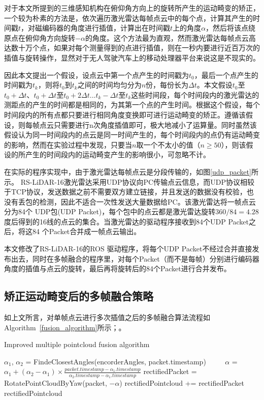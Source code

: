 对于本文所提到的三维感知机构在俯仰角方向上的旋转所产生的运动畸变的矫正，一个较为朴素的方法是，依次遍历激光雷达每帧点云中的每个点，计算其产生的时间戳$t$，对磁编码器的角度进行插值，计算出在时间戳$t$上的角度$\alpha$，然后将该点绕原点在俯仰角方向旋转$-\alpha$的角度。这个方法最为直观，然而激光雷达每帧点云高达数十万个点，如果对每个测量得到的点进行插值，则在一秒内要进行近百万次的插值与旋转操作，显然对于无人驾驶汽车上的移动处理器平台来说这是不现实的。

因此本文提出一个假设，设点云中第一个点产生的时间戳为$t_0$，最后一个点产生的时间戳为$t_k$，则将$t_0$到$t_k$之间的时间均匀分为$n$份，每份长为$\Delta t$。本文假设$t_0$至$t_0+\Delta t$、$t_0+\Delta t$至$t_0+2\Delta t$...$t_k-\Delta t$至$t_k$这些时间段，每个时间段内的激光雷达的测距点的产生的时间都是相同的，为其第一个点的产生时间。根据这个假设，每个时间段内的所有点都只要进行相同角度变换即可进行运动畸变的矫正。遵循该假设，则每帧点云只需要进行n次角度插值即可，极大地减小了运算量。同时虽然该假设认为同一时间段内的点云是同一时间产生的，每个时间段内的点仍有运动畸变的影响，然而在实验过程中发现，只要当$n$取一个不太小的值（$n\geq 50$），则该假设的所产生的时间段内的运动畸变产生的影响很小，可忽略不计。

在实际的程序实现中，由于激光雷达每帧点云是分段传输的，如图\ref{udp_packet}所示。
RS-LiDAR-16激光雷达采用UDP协议向PC传输点云信息，而UDP协议相较于TCP协议，发送数据之前不需要双方建立链接，并且发送的数据没有校验，也没有丢包的检测，因此不适合一次性发送大量数据给PC。该激光雷达将一帧点云分为84个 UDP包(UDP Packet)，每个包中的点云都是激光雷达旋转$360 / 84 = 4.28$度后得到的16线的点云的集合。当激光雷达的驱动程序接收到84个UDP Packet之后，将这84 个Packet合并成一帧点云输出。

本文修改了RS-LiDAR-16的ROS 驱动程序，将每个UDP Packet不经过合并直接发布出去，同时在多帧融合的程序里，对每个Packet（而不是每帧）分别进行编码器角度的插值与点云的旋转，最后再将旋转后的84个Packet进行合并发布。

\subsection{矫正运动畸变后的多帧融合策略}

如上文所言，对单帧点云进行多次插值之后的多帧融合算法流程如Algorithm~\ref{fusion_algorithm}所示；。

\begin{algorithm}[t]
    \caption{Improved multiple pointcloud fusion algorithm} %
    \label{fusion_algorithm}
    \begin{algorithmic}[1]
        \State $\alpha_1$, $\alpha_2$ = FindeClosestAngles(encorderAngles, packet.timestamp)
    　　 \State $\alpha$ = $\alpha_1+(\alpha_2-\alpha_1)\times \frac{packet.timestamp - \alpha_1.timestamp}{\alpha_2.timestamp - \alpha_1.timestamp}$
        \State rectifiedPacket = RotatePointCloudByYaw(packet, $-\alpha$)
        \State rectifiedPointcloud += rectifiedPacket
    \EndFor
    \State \Return rectifiedPointcloud
    \end{algorithmic}
\end{algorithm}

